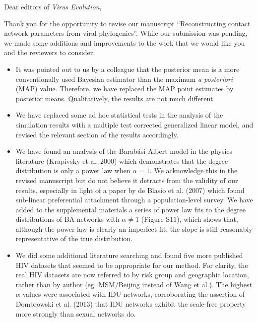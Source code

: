 \documentclass[12pt]{letter}
\begin{document}
\begin{letter}{ }

\opening{Dear editors of \textit{Virus Evolution},}

Thank you for the opportunity to revise our manuscript ``Reconstructing contact
network parameters from viral phylogenies''. While our submission was pending,
we made some additions and improvements to the work that we would like you and
the reviewers to consider. 

\begin{itemize}

  \item It was pointed out to us by a colleague that the posterior mean is a
    more conventionally used Bayesian estimator than the maximum \textit{a
    posteriori} (MAP) value. Therefore, we have replaced the MAP point
    estimates by posterior means. Qualitatively, the results are not much
    different.
  \item We have replaced some ad hoc statistical tests in the analysis of the
    simulation results with a multiple test corrected generalized linear model,
    and revised the relevant section of the results accordingly.
  \item We have found an analysis of the Barab\'asi-Albert model in the physics
    literature (Krapivsky et al. 2000) which demonstrates that the degree
    distribution is only a power law when $\alpha = 1$. We acknowledge this in
    the revised manuscript but do not believe it detracts from the validity of
    our results, especially in light of a paper by de Blasio et al. (2007)
    which found sub-linear preferential attachment through a population-level
    survey. We have added to the supplemental materials a series of power law
    fits to the degree distributions of BA networks with $\alpha \neq 1$
    (Figure S11), which shows that, although the power law is clearly an
    imperfect fit, the slope is still reasonably representative of the true
    distribution.
  \item We did some additional literature searching and found five more
    published HIV datasets that seemed to be appropriate for our method. For
    clarity, the real HIV datasets are now referred to by risk group and
    geographic location, rather than by author (eg. MSM/Beijing instead of Wang
    et al.). The highest $\alpha$ values were associated with IDU networks,
    corroborating the assertion of Dombrowski et al. (2013) that IDU networks
    exhibit the scale-free property more strongly than sexual networks do. 

\end{itemize}
\end{letter}
\end{document}
